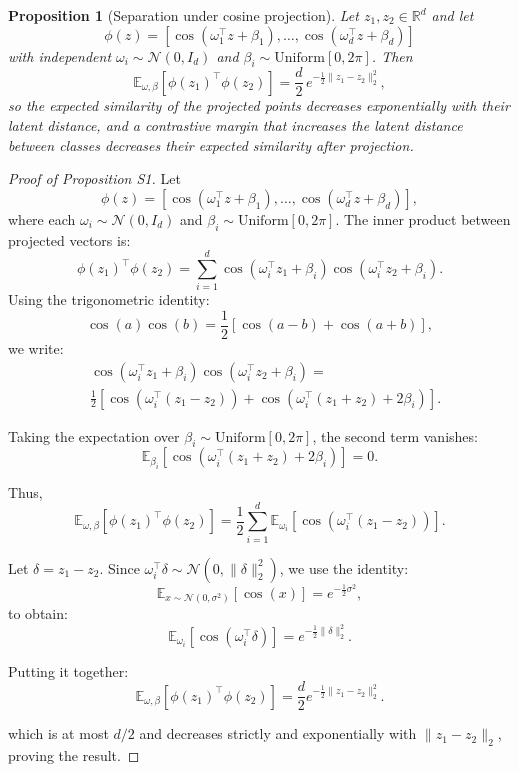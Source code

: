 \documentclass[10pt]{article}
\newtheorem{proposition}{Proposition}
\begin{document}
\begin{proposition}[Separation under cosine projection]
Let $z_1, z_2 \in \mathbb{R}^d$ and let
\[\phi(z) = \left[\cos(\omega_1^\top z + \beta_1), \dots, \cos(\omega_d^\top z + \beta_d)\right]\]
with independent $\omega_i \sim \mathcal{N}(0, I_d)$ and $\beta_i \sim \mathrm{Uniform}[0, 2\pi]$. Then
\[
\mathbb{E}_{\omega, \beta}\left[\phi(z_1)^\top \phi(z_2)\right] = \frac{d}{2}\, e^{-\frac{1}{2}\|z_1 - z_2\|_2^2},
\]
so the expected similarity of the projected points decreases exponentially with their latent distance, and a contrastive margin that increases the latent distance between classes decreases their expected similarity after projection.
\end{proposition}

\begin{proof}[Proof of Proposition S1]
Let
\[\phi(z) = \left[ \cos(\omega_1^\top z + \beta_1), \dots, \cos(\omega_d^\top z + \beta_d) \right],\]
where each $\omega_i \sim \mathcal{N}(0, I_d)$ and $\beta_i \sim \mathrm{Uniform}[0, 2\pi]$. The inner product between projected vectors is:
\[
\phi(z_1)^\top \phi(z_2) = \sum_{i=1}^d \cos(\omega_i^\top z_1 + \beta_i) \cos(\omega_i^\top z_2 + \beta_i).
\]
Using the trigonometric identity:
\[
\cos(a)\cos(b) = \frac{1}{2}[\cos(a - b) + \cos(a + b)],
\]
we write:
\begin{align*}
    &\cos(\omega_i^\top z_1 + \beta_i) \cos(\omega_i^\top z_2 + \beta_i) = \\
&\frac{1}{2} \left[ \cos(\omega_i^\top(z_1 - z_2)) + \cos(\omega_i^\top(z_1 + z_2) + 2\beta_i) \right].    
\end{align*}


Taking the expectation over $\beta_i \sim \mathrm{Uniform}[0, 2\pi]$, the second term vanishes:
\[
\mathbb{E}_{\beta_i}[\cos(\omega_i^\top(z_1 + z_2) + 2\beta_i)] = 0.
\]

Thus,
\[
\mathbb{E}_{\omega, \beta}[\phi(z_1)^\top \phi(z_2)] = \frac{1}{2} \sum_{i=1}^d \mathbb{E}_{\omega_i}[\cos(\omega_i^\top(z_1 - z_2))].
\]

Let $\delta = z_1 - z_2$. Since $\omega_i^\top \delta \sim \mathcal{N}(0, \|\delta\|_2^2)$, we use the identity:
\[
\mathbb{E}_{x \sim \mathcal{N}(0, \sigma^2)}[\cos(x)] = e^{-\frac{1}{2}\sigma^2},
\]
to obtain:
\[
\mathbb{E}_{\omega_i}[\cos(\omega_i^\top \delta)] = e^{-\frac{1}{2}\|\delta\|_2^2}.
\]

Putting it together:
\[
\mathbb{E}_{\omega, \beta}[\phi(z_1)^\top \phi(z_2)] = \frac{d}{2} e^{-\frac{1}{2}\|z_1 - z_2\|_2^2}.
\]

which is at most $d/2$ and decreases strictly and exponentially with $\|z_1 - z_2\|_2$, proving the result.
\end{proof}
\end{document}
